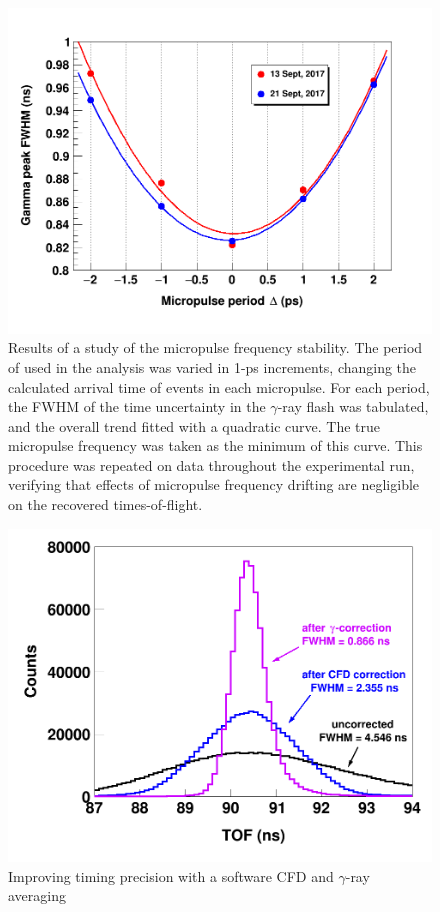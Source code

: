 \begin{figure}
    \includegraphics[scale=0.24]{figures/RFTimeStudy.png}
    \caption[Stability of the beam pick-off (T$_{0}$) during the experiment]
    {Results of a study of the micropulse frequency stability. The period of \tZero used
        in the analysis was varied in 1-ps increments, changing the
        calculated arrival time of events in each micropulse. For each period, the FWHM of
        the time uncertainty in the $\gamma$-ray flash was tabulated, and the
        overall trend fitted with a quadratic curve. The true micropulse
        frequency was taken as the minimum of this curve. This procedure was
        repeated on data throughout the experimental run, verifying that effects
        of micropulse frequency drifting are negligible on the recovered
        times-of-flight.
    }
    \label{RFTimeStudy}
\end{figure}


\begin{figure}
    \includegraphics[scale=0.24]{figures/TimeCorrections.png}
    \caption{Improving timing precision with a software CFD and $\gamma$-ray averaging}
    \label{TimingCorrectionStudy}
\end{figure}

